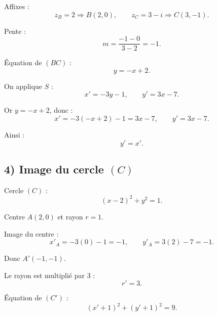 \documentclass[12pt,a4paper]{article}
\begin{document}
Affixes :
\[
z_B = 2 \Rightarrow B(2,0), \qquad
z_C = 3 - i \Rightarrow C(3,-1).
\]

Pente :
\[
m = \frac{-1 - 0}{3 - 2} = -1.
\]

Équation de $(BC)$ :
\[
y = -x + 2.
\]

On applique $S$ :
\[
x' = -3y - 1, \qquad y' = 3x - 7.
\]

Or $y = -x + 2$, donc :
\[
x' = -3(-x + 2) - 1 = 3x - 7,
\qquad
y' = 3x - 7.
\]

Ainsi :
\[
\boxed{y' = x'.}
\]

\subsection*{4) Image du cercle $(C)$}

Cercle $(C)$ :
\[
(x - 2)^2 + y^2 = 1.
\]

Centre $A(2,0)$ et rayon $r = 1$.

Image du centre :
\[
x'_A = -3(0) - 1 = -1,
\qquad
y'_A = 3(2) - 7 = -1.
\]

Donc $A'(-1,-1)$.

Le rayon est multiplié par $3$ :
\[
r' = 3.
\]

Équation de $(C')$ :
\[
\boxed{(x' + 1)^2 + (y' + 1)^2 = 9.}
\]
\end{document}
